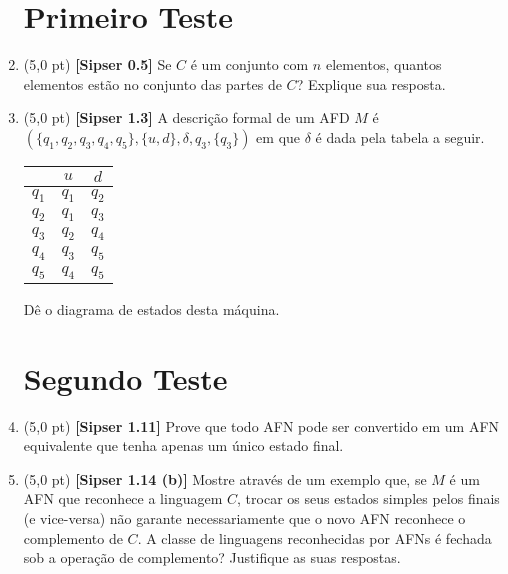 \documentclass[12pt,a4paper,oneside]{article}
\begin{document}
\begin{enumerate}
	
	\section*{Primeiro Teste}
	
	\item (5,0 pt) {\bf [Sipser 0.5]} Se $C$ é um conjunto com $n$ elementos, quantos elementos estão no conjunto das partes de $C$? Explique sua resposta.
	
	\item (5,0 pt) {\bf [Sipser 1.3]} A descrição formal de um AFD $M$ é \\
	$(\{q_1, q_2, q_3, q_4, q_5\}, \{u,d\}, \delta, q_3, \{q_3\})$ em que $\delta$ é dada pela tabela a seguir.
	
	\begin{center}
		\begin{tabular}{c|cc}
					&	$u$		&	$d$	\\
			\hline
			$q_1$	&	$q_1$ 	&	$q_2$	\\
			$q_2$	&	$q_1$ 	&	$q_3$	\\
			$q_3$	&	$q_2$ 	&	$q_4$	\\
			$q_4$	&	$q_3$ 	&	$q_5$	\\
			$q_5$	&	$q_4$ 	&	$q_5$	\\
			\hline
		\end{tabular}
	\end{center}
	
	Dê o diagrama de estados desta máquina.
	
	\section*{Segundo Teste}
	
	\item (5,0 pt) {\bf [Sipser 1.11]}  Prove que todo AFN pode ser convertido em um AFN equivalente que tenha apenas um único estado final.
	
	\item (5,0 pt) {\bf [Sipser 1.14 (b)]} Mostre através de um exemplo que, se $M$ é um AFN que reconhece a linguagem $C$, trocar os seus estados simples pelos finais (e vice-versa) não garante necessariamente que o novo AFN reconhece o complemento de $C$. A classe de linguagens reconhecidas por AFNs é fechada sob a operação de complemento? Justifique as suas respostas.

\end{enumerate}
\end{document}

